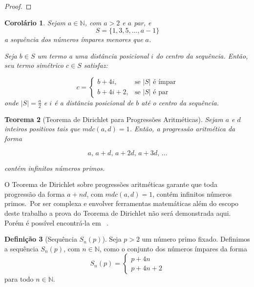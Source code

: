 \documentclass[a4paper,11pt]{article}
\newtheorem{theorem}{Teorema}[section]
\newtheorem{corollary}[theorem]{Corolário}
\theoremstyle{definition}
\newtheorem{definition}[theorem]{Definição}
\theoremstyle{remark}
\begin{document}
\begin{otherlanguage}{brazil}
\begin{proof}
	\end{proof}
	
	\begin{corollary} \label{coro:par_simetrico}
		Sejam $a \in \mathbb{N}$, com $a > 2$ e $a$ par, e
		\[
		S = \{1, 3, 5, \dotsc, a - 1\}
		\]
		a sequência dos números ímpares menores que $a$.
		
		Seja $b \in S$ um termo a uma distância posicional $i$ do centro da sequência. Então, seu termo simétrico $c \in S$ satisfaz:
		
		\[
		c =
		\begin{cases}
			b + 4i, & \text{se } |S| \text{ é ímpar} \\
			b + 4i + 2, & \text{se } |S| \text{ é par}
		\end{cases}
		\]
		onde $|S| = \frac{a}{2}$ e $i$ é a distância posicional de $b$ até o centro da sequência.
	\end{corollary}
	
	
	
	\begin{theorem}[Teorema de Dirichlet para Progressões Aritméticas] \label{teo:dirichlet}
		Sejam $a$ e $d$ inteiros positivos tais que $mdc(a, d) = 1$. Então, a progressão aritmética da forma
		
		\[
		a,\, a + d,\, a + 2d,\, a + 3d,\, \dots
		\]
		
		contém infinitos números primos.
	\end{theorem}
	
	O Teorema de Dirichlet sobre progressões aritméticas garante que toda progressão da forma $a + nd$, com $mdc(a, d) = 1$, contém infinitos números primos.~Por ser complexa e envolver ferramentas matemáticas além do escopo deste trabalho a prova do Teorema de Dirichlet não será demonstrada aqui. Porém é possível encontrá-la em ~\cite{apostol}.  
	
	\begin{definition}[Sequência \(S_n(p)\)]\label{def:snp}
		Seja \(p > 2\) um número primo fixado. Definimos a sequência \(S_n(p)\), com \(n \in \mathbb{N}\), como o conjunto dos números ímpares da forma
		\[
		S_n(p) = 
		\begin{cases}
			p + 4n \\
			p + 4n + 2
		\end{cases}
		\]
		para todo \(n \in \mathbb{N}\).
	\end{definition}
	
	\vspace{0.5cm}
	

\end{otherlanguage}
\end{document}

